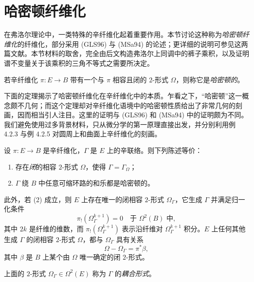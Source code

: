 \section{哈密顿纤维化}
\label{sec:hamiltonian-fibration}

在弗洛尔理论中，一类特殊的辛纤维化起着重要作用。本节讨论这种称为\emph{哈密顿纤维化}的纤维化，部分采用 (GLS96) 与 (MSa94) 的论述；更详细的说明可参见这两篇文献。本节材料的取舍，完全由后文构造弗洛尔上同调中的裤子乘积，以及证明谱不变量关于该乘积的三角不等式之需要所决定。

\begin{definition}\label{def:hamiltonian-fibration}
若辛纤维化 $\pi:E\to B$ 带有一个与 $\pi$ 相容且闭的 $2$-形式
$\Omega$，则称它是\emph{哈密顿的}。
\end{definition}

下面的定理揭示了哈密顿纤维化在辛纤维化中的本质。乍看之下，“哈密顿”这一概念颇不几何；而这个定理却对辛纤维化语境中的哈密顿性质给出了非常几何的刻画，因而相当引人注目。这里的证明与 (GLS96) 和 (MSa94) 中的证明颇为不同。我们避免使用过多背景材料，只从微分学的第一原理直接出发，并分别利用例 4.2.3 与例 4.2.5 对圆周上和曲面上辛纤维化的刻画。

\begin{theorem}\label{thm:hamiltonian-fibration-characterization}
设 $\pi:E\to B$ 是辛纤维化，$\Gamma$ 是 $E$ 上的辛联络。则下列陈述等价：
\begin{enumerate}[label=(\arabic*)]
\item 存在\emph{闭}的相容 $2$-形式 $\Omega$，使得 $\Gamma=\Gamma_\Omega$；
\item $\Gamma$ 绕 $B$ 中任意可缩环路的和乐都是哈密顿的。
\end{enumerate}
此外，若 (2) 成立，则 $E$ 上存在唯一的闭相容 $2$-形式 $\Omega_\Gamma$，它生成 $\Gamma$ 并满足归一化条件
\[
 \pi_!(\Omega_\Gamma^{k+1})=0
 \quad\text{于 }\Omega^2(B)\text{ 中},
\]
其中 $2k$ 是纤维的维数，而 $\pi_!(\Omega_\Gamma^{k+1})$ 表示沿纤维对
$\Omega_\Gamma^{k+1}$ 积分。$E$ 上任何其他生成 $\Gamma$ 的闭相容
$2$-形式 $\Omega$，都与 $\Omega_\Gamma$ 具有关系
\[
 \Omega-\Omega_\Gamma=\pi^*\beta,
\]
其中 $\beta$ 是 $B$ 上某个由 $\Omega$ 唯一确定的闭 $2$-形式。
\end{theorem}

上面的 $2$-形式 $\Omega_\Gamma\in\Omega^2(E)$ 称为 $\Gamma$ 的\emph{耦合形式}。

